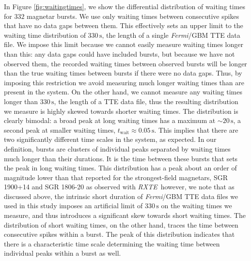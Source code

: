 \documentclass[12pt]{emulateapj}
\newcommand{\project}[1]{\textsl{#1}}
\newcommand{\fermi}{\project{Fermi}}
\newcommand{\rxte}{\project{RXTE}}
\begin{document}
In Figure \ref{fig:waitingtimes}, we show the differential distribution of waiting times for $332$ magnetar bursts. We use only waiting times 
between consecutive spikes that have no data gaps between them. This effectively sets an upper limit to the waiting time distribution of $330\,\mathrm{s}$,
the length of a single \fermi/GBM TTE data file. We impose this limit because we cannot easily measure waiting times longer than this: any data gaps could 
have included bursts, but because we have not observed them, the recorded waiting times between observed bursts will be longer than the true waiting times
between bursts if there were no data gaps. Thus, by imposing this restriction we avoid measuring much longer waiting times than are present in the system.
On the other hand, we cannot measure any waiting times longer than $330\,\mathrm{s}$, the length of a TTE data file, thus the resulting distribution we measure is
highly skewed towards shorter waiting times.
 The distribution is clearly bimodal: a broad peak at long waiting times has a maximum at $\sim\!\! 20 \,\mathrm{s}$, a
second peak at smaller waiting times, $t_\mathrm{wait} \approx 0.05 \,\mathrm{s}$. This implies that there are two significantly different time scales
in the system, as expected. In our definition, bursts are clusters of individual peaks separated by
waiting times much longer than their durations. It is the time between these bursts that sets the peak in long waiting times. This distribution has a peak about
an order of magnitude lower than that reported for the strongest-field magnetars, SGR 1900+14 \citep{gogus1999} and SGR 1806-20 \citep{gogus2000} as observed
with \rxte\, however, we note that as discussed above, the intrinsic short duration of \fermi/GBM TTE data files we used in this study imposes an artificial limit of $330\,\mathrm{s}$ on the waiting times we measure,
and thus introduces a significant skew towards short waiting times. 
The distribution of short waiting times, on the other hand, traces the time between consecutive spikes within a burst. The peak of this distribution indicates
that there is a characteristic time scale determining the waiting time between individual peaks within a burst as well. 
\end{document}
